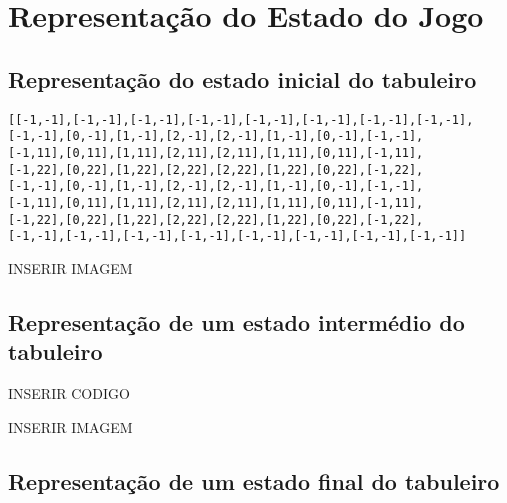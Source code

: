 \documentclass[a4paper]{article}
\begin{document}




\section{Representação do Estado do Jogo}

\subsection{Representação do estado inicial do tabuleiro}

\begin{small}
\begin{lstlisting}
[[-1,-1],[-1,-1],[-1,-1],[-1,-1],[-1,-1],[-1,-1],[-1,-1],[-1,-1],
[-1,-1],[0,-1],[1,-1],[2,-1],[2,-1],[1,-1],[0,-1],[-1,-1],
[-1,11],[0,11],[1,11],[2,11],[2,11],[1,11],[0,11],[-1,11],
[-1,22],[0,22],[1,22],[2,22],[2,22],[1,22],[0,22],[-1,22],
[-1,-1],[0,-1],[1,-1],[2,-1],[2,-1],[1,-1],[0,-1],[-1,-1],
[-1,11],[0,11],[1,11],[2,11],[2,11],[1,11],[0,11],[-1,11],
[-1,22],[0,22],[1,22],[2,22],[2,22],[1,22],[0,22],[-1,22],
[-1,-1],[-1,-1],[-1,-1],[-1,-1],[-1,-1],[-1,-1],[-1,-1],[-1,-1]]
\end{lstlisting}
\end{small}

INSERIR IMAGEM


\subsection{Representação de um estado intermédio do tabuleiro}

INSERIR CODIGO

INSERIR IMAGEM

\subsection{Representação de um estado final do tabuleiro}
\end{document}
